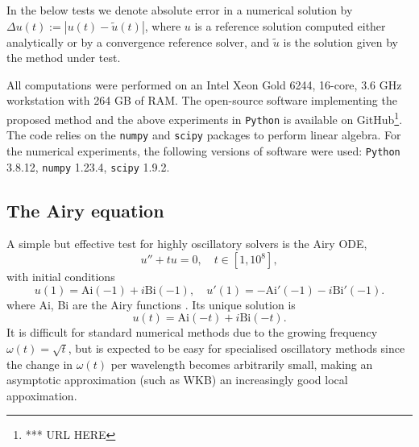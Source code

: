 \documentclass[10pt]{article}
\newcommand{\be}{\begin{equation}}
\newcommand{\ee}{\end{equation}}
\newcommand{\om}{\omega}
\newcommand{\AB}[1]{{\color{orange}#1}}
\begin{document}
In the below tests we denote absolute error in a numerical solution by
$\Delta u(t) := |u(t) - \tilde u(t)|$, where
$u$ is a reference solution computed either analytically
or by a convergence reference solver,
and $\tilde u$ is the solution given by the method under test.

All computations were performed on an Intel Xeon Gold 6244,
16-core, 3.6 GHz workstation with 264 GB of RAM.
The open-source software implementing the proposed method and the above
experiments in \texttt{Python} is available on GitHub\footnote{*** URL HERE}.
The code relies on the \texttt{numpy} \cite{numpy2020} and \texttt{scipy} \cite{scipy2020}
packages to perform linear algebra. For the numerical experiments, the
following versions of software were used: \texttt{Python} 3.8.12,
\texttt{numpy} 1.23.4, \texttt{scipy} 1.9.2.


\subsection{The Airy equation}\label{airy-demo}

A simple but effective test for highly oscillatory solvers is the Airy ODE,
\be
u'' + tu = 0, \quad t \in [1, 10^8],
\label{airy}
\ee
with initial conditions
\be
u(1) = \text{Ai}(-1) + i\text{Bi}(-1), \quad u'(1) = - \text{Ai}'(-1) -i\text{Bi}'(-1).
\label{airyic}
\ee
where Ai, Bi are the Airy functions \cite[Chapter~9]{DLMFairy}.
Its unique solution is
\be
u(t) = \text{Ai}(-t) + i\text{Bi}(-t).
\ee
It is difficult
for standard numerical methods due to the growing frequency $\om(t) = \sqrt{t}$,
but is expected
to be easy for specialised oscillatory methods since the change in $\om(t)$ per wavelength becomes arbitrarily small, making an asymptotic approximation (such as WKB) 
an increasingly good local appoximation.
\end{document}
